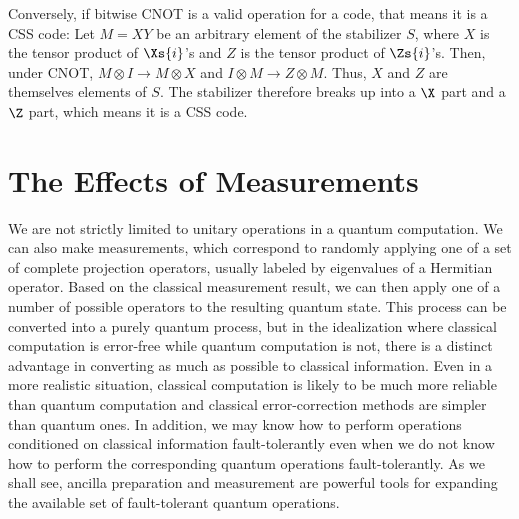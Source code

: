 Conversely, if bitwise CNOT is a valid operation for a code, that means it is
a CSS code: Let $M = X Y$ be an arbitrary element of the stabilizer $S$,
where $X$ is the tensor product of $\Xs{i}$'s and $Z$ is the tensor product of
$\Zs{i}$'s.  Then, under CNOT, $M \otimes I \rightarrow M \otimes X$ and
$I \otimes M \rightarrow Z \otimes M$.  Thus, $X$ and $Z$ are themselves
elements of $S$.  The stabilizer therefore breaks up into a $\X$ part and a
$\Z$ part, which means it is a CSS code.

\section{The Effects of Measurements}
\label{sec-measurements}

We are not strictly limited to unitary operations in a quantum
computation.  We can also make measurements, which correspond to
randomly applying one of a set of complete projection operators, usually
labeled by eigenvalues of a Hermitian operator.  Based on the classical
measurement result, we can then apply one of a number of possible
operators to the resulting quantum state.  This process can be converted
into a purely quantum process, but in the idealization where classical
computation is error-free while quantum computation is not, there is a
distinct advantage in converting as much as possible to classical
information.  Even in a more realistic situation, classical computation is
likely to be much more reliable than quantum computation and classical
error-correction methods are simpler than quantum ones.  In addition, we
may know how to perform operations conditioned on classical information
fault-tolerantly even when we do not know how to perform the
corresponding quantum operations fault-tolerantly.  As we shall see,
ancilla preparation and measurement are powerful tools for expanding the
available set of fault-tolerant quantum operations.

